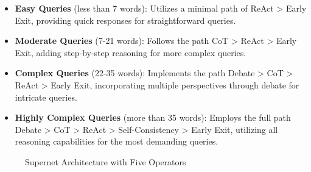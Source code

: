 \documentclass[../Main.tex]{subfiles}
\begin{document}
\begin{minipage}[t]{0.6\textwidth}
\begin{itemize}
    \item \textbf{Easy Queries} (less than 7 words): Utilizes a minimal path of ReAct > Early Exit, providing quick responses for straightforward queries.
    
    \item \textbf{Moderate Queries} (7-21 words): Follows the path CoT > ReAct > Early Exit, adding step-by-step reasoning for more complex queries.
    
    \item \textbf{Complex Queries} (22-35 words): Implements the path Debate > CoT > ReAct > Early Exit, incorporating multiple perspectives through debate for intricate queries.
    
    \item \textbf{Highly Complex Queries} (more than 35 words): Employs the full path Debate > CoT > ReAct > Self-Consistency > Early Exit, utilizing all reasoning capabilities for the most demanding queries.
\end{itemize}

\end{minipage}
\hfill
\begin{minipage}[t]{0.35\textwidth}
\begin{figure}[H]
    \centering
    \caption{Supernet Architecture with Five Operators}
    \label{fig:supernet_architecture}
\end{figure}
\end{minipage}
\end{document}
